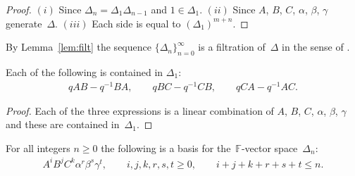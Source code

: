 \begin{proof}
$(i)$ Since $\Delta_n=\Delta_1 \Delta_{n-1}$
and $1 \in \Delta_1$.
$(ii)$ Since $A$, $B$, $C$, $\alpha$, $\beta$, $\gamma $ generate~$\Delta$.
$(iii)$ Each side is equal to
$(\Delta_1)^{m+n}$.
\end{proof}

By Lemma~\ref{lem:filt} the sequence
$\lbrace \Delta_n\rbrace_{n=0}^\infty$ is a f\/iltration of~$\Delta$ in the sense of
\cite[p.~202]{carter}.


\begin{Lemma}
\label{lem:almostcom}
Each of the following is contained in $\Delta_1$:
\begin{gather*}
qAB-q^{-1}BA,
\qquad
qBC-q^{-1}CB,
\qquad
qCA-q^{-1}AC.
\end{gather*}
\end{Lemma}

\begin{proof}
Each of the three expressions is a linear combination of
$A$, $B$, $C$, $\alpha$, $\beta$, $\gamma$ and these are contained in~$\Delta_1$.
\end{proof}

\begin{Theorem}\label{lem:unbasis}
For all integers $n\geq 0$ the following is
a basis for the~$\mathbb F$-vector space~$\Delta_n$:
\begin{gather}
\label{eq:basislist}
A^iB^jC^k\alpha^r \beta^s \gamma^t, \qquad
i,j,k,r,s,t\geq 0, \qquad
i+j+k+r+s+t \leq n.
\end{gather}
\end{Theorem}

